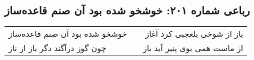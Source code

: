 \begin{center}
\section*{رباعی شماره ۲۰۱: خوشخو شده بود آن صنم قاعده‌ساز}
\label{sec:sh201}
\begin{longtable}{l p{0.5cm} r}
خوشخو شده بود آن صنم قاعده‌ساز
&&
باز از شوخی بلعجبی کرد آغاز
\\
چون گوز درآگند دگر باز از ناز
&&
از ماست همی بوی پنیر آید باز
\\
\end{longtable}
\end{center}
